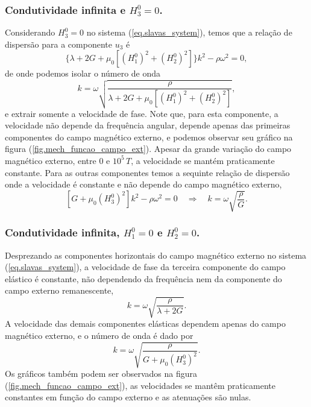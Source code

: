 \subsubsection{Condutividade infinita e $H_3^0=0$.}
Considerando $H_3^0=0$ no sistema (\ref{eq.slavas_system}), temos que a rela\c{c}\~ao de dispers\~ao para a componente $u_3$ \'e 
\begin{equation}
\{\lambda+2G+\mu_0\left[(H^0_1)^2+(H^0_2)^2\right]\}k^2-\rho\omega^2=0,
\end{equation}
de onde podemos isolar o n\'umero de onda
\begin{equation}
k=\omega\sqrt{\frac{\rho}{\lambda+2G+\mu_0\left[(H^0_1)^2+(H^0_2)^2\right]}},
\end{equation}
e extrair somente a velocidade de fase.
Note que, para esta componente, a velocidade n\~ao depende da frequ\^encia angular, depende apenas das primeiras componentes do campo magn\'etico externo, e podemos observar seu gr\'afico na figura (\ref{fig.mech_funcao_campo_ext}). Apesar da grande varia\c{c}\~ao do campo magn\'etico externo, entre 0 e $10^5\,T$, a velocidade se mant\'em praticamente constante.
Para as outras componentes temos a sequinte rela\c{c}\~ao de dispers\~ao onde a velocidade \'e constante e n\~ao depende do campo magn\'etico externo,
\begin{equation}
\left[G+\mu_0(H^0_3)^2\right]k^2-\rho\omega^2=0\quad\Rightarrow\quad k=\omega\sqrt{\frac{\rho}{G}}.
\end{equation} 
 

\subsubsection{Condutividade infinita, $H_1^0=0$ e $H_2^0=0$.}

Desprezando as componentes horizontais do campo magn\'etico externo no sistema (\ref{eq.slavas_system}), a velocidade de fase da terceira componente do campo el\'astico \'e constante, n\~ao dependendo da frequ\^encia nem da componente do campo externo remanescente,
\begin{equation}
k=\omega\sqrt{\frac{\rho}{\lambda+2G}}.
\end{equation}
A velocidade das demais componentes el\'asticas dependem apenas do campo magn\'etico externo, e o n\'umero de onda \'e dado por
\begin{equation}
k=\omega\sqrt{\frac{\rho}{G+\mu_0(H_3^0)^2}}.
\end{equation}
Os gr\'aficos tamb\'em podem ser observados na figura (\ref{fig.mech_funcao_campo_ext}), as velocidades se mant\^em praticamente constantes em fun\c{c}\~ao do campo externo e as atenua\c{c}\~oes s\~ao nulas.

